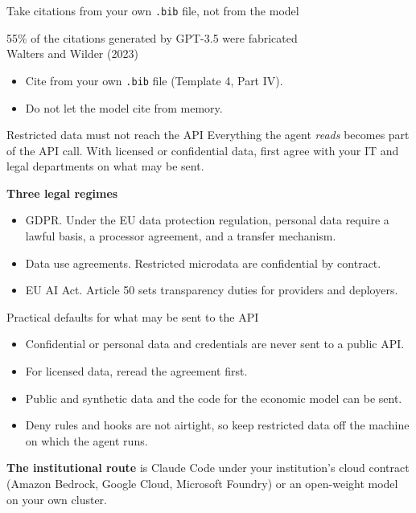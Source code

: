 \documentclass[aspectratio=169,10pt]{beamer}
\newcommand{\emphc}[1]{\textcolor{harvardcrimson}{#1}}
\begin{document}
\begin{frame}{Take citations from your own \texttt{.bib} file, not from the model}
\begin{center}
{\large 55\% of the citations generated by GPT-3.5 were fabricated}\\[5pt]
{\small\textcolor{uzhgreydark}{Walters and Wilder (2023)}}
\end{center}

\vspace{1.5em}
\begin{itemize}\itemsep9pt
  \item Cite from your own \texttt{.bib} file (Template 4, Part IV).
  \item Do not let the model cite from memory.
\end{itemize}
\end{frame}

\begin{frame}{Restricted data must not reach the API}
Everything the agent \emph{reads} becomes part of the API call. With licensed or confidential data, first agree with your IT and legal departments on what may be sent.

\vspace{1.0em}
\textbf{Three legal regimes}
\begin{itemize}\itemsep9pt
  \item \emphc{GDPR.} Under the EU data protection regulation, personal data require a lawful basis, a processor agreement, and a transfer mechanism.
  \item \emphc{Data use agreements.} Restricted microdata are confidential by contract.
  \item \emphc{EU AI Act.} Article 50 sets transparency duties for providers and deployers.
\end{itemize}
\end{frame}

\begin{frame}{Practical defaults for what may be sent to the API}
\begin{itemize}\itemsep10pt
  \item[\textcolor{darkred}{\ding{55}}] Confidential or personal data and credentials are never sent to a public API.
  \item[\textcolor{softorange}{\textbf{?}}] For licensed data, reread the agreement first.
  \item[\textcolor{darkgreen}{\checkmark}] Public and synthetic data and the code for the economic model can be sent.
  \item[\textcolor{softorange}{\textbf{!}}] Deny rules and hooks are not airtight, so keep restricted data off the machine on which the agent runs.
\end{itemize}

\vspace{1.1em}
\textbf{The institutional route} is Claude Code under your institution's cloud contract (Amazon Bedrock, Google Cloud, Microsoft Foundry) or an open-weight model on your own cluster.
\end{frame}
\end{document}
